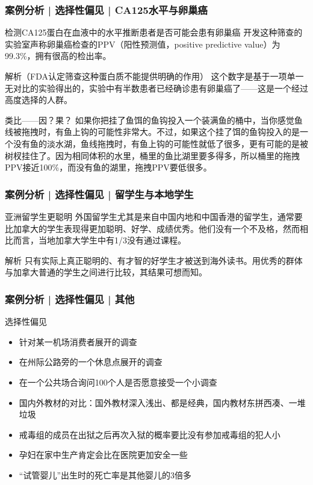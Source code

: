 \begin{frame}
  \frametitle{案例分析 | 选择性偏见 | CA125水平与卵巢癌}
  \begin{block}{检测CA125蛋白在血液中的水平推断患者是否可能会患有卵巢癌}
    开发这种筛查的实验室声称卵巢癌检查的PPV（阳性预测值，positive predictive value）为99.3\%，拥有很高的检出率。
  \end{block}
  \pause \pause \pause \pause
  \vspace{-0.3em}
  \begin{block}{解析（FDA认定筛查这种蛋白质不能提供明确的作用）}
    这个数字是基于一项单一无对比的实验得出的，实验中有半数患者已经确诊患有卵巢癌了——这是一个经过高度选择的人群。
  \end{block}
  \pause \pause \pause \pause
  \vspace{-0.3em}
  \begin{block}{类比——因？果？}
    如果你把挂了鱼饵的鱼钩投入一个装满鱼的桶中，当你感觉鱼线被拖拽时，有鱼上钩的可能性非常大。不过，如果这个挂了饵的鱼钩投入的是一个没有鱼的淡水湖，鱼线拖拽时，有鱼上钩的可能性就低了很多，更有可能的是被树杈挂住了。因为相同体积的水里，桶里的鱼比湖里要多得多，所以桶里的拖拽PPV接近100\%，而没有鱼的湖里，拖拽PPV要低很多。
  \end{block}
\end{frame}

\begin{frame}
  \frametitle{案例分析 | 选择性偏见 | 留学生与本地学生}
  \begin{block}{亚洲留学生更聪明}
    外国留学生尤其是来自中国内地和中国香港的留学生，通常要比加拿大的学生表现得更加聪明、好学、成绩优秀。他们没有一个不及格，然而相比而言，当地加拿大学生中有1/3没有通过课程。
  \end{block}
  \pause \pause \pause \pause
  \begin{block}{解析}
    只有实际上真正聪明的、有才智的好学生才被送到海外读书。用优秀的群体与加拿大普通的学生之间进行比较，其结果可想而知。
  \end{block}
\end{frame}

\begin{frame}
  \frametitle{案例分析 | 选择性偏见 | 其他}
  \begin{block}{选择性偏见}
    \begin{itemize}
      \item 针对某一机场消费者展开的调查
      \item 在州际公路旁的一个休息点展开的调查
      \item 在一个公共场合询问100个人是否愿意接受一个小调查
      \item 国内外教材的对比：国外教材深入浅出、都是经典，国内教材东拼西凑、一堆垃圾
      \item 戒毒组的成员在出狱之后再次入狱的概率要比没有参加戒毒组的犯人小
      \item 孕妇在家中生产肯定会比在医院更加安全一些
      \item “试管婴儿”出生时的死亡率是其他婴儿的3倍多
    \end{itemize}
  \end{block}
\end{frame}

